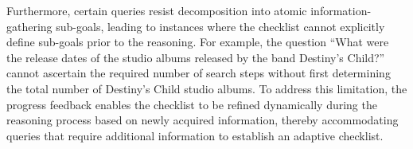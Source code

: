 Furthermore, certain queries resist decomposition into atomic information-gathering sub-goals, leading to instances where the checklist cannot explicitly define sub-goals prior to the reasoning. For example, the question ``What were the release dates of the studio albums released by the band Destiny’s Child?'' cannot ascertain the required number of search steps without first determining the total number of Destiny’s Child studio albums. To address this limitation, the progress feedback enables the checklist to be {refined dynamically} during the reasoning process based on newly acquired information, thereby accommodating queries that require additional information to establish an adaptive checklist.


